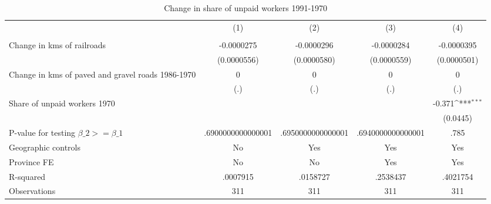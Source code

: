 \begin{table}[htbp]\centering
\def\sym#1{\ifmmode^{#1}\else\(^{#1}\)\fi}
\caption{Change in share of unpaid workers 1991-1970}
\begin{tabular}{l*{4}{c}}
\hline\hline
                &\multicolumn{1}{c}{(1)}&\multicolumn{1}{c}{(2)}&\multicolumn{1}{c}{(3)}&\multicolumn{1}{c}{(4)}\\
                &\multicolumn{1}{c}{}&\multicolumn{1}{c}{}&\multicolumn{1}{c}{}&\multicolumn{1}{c}{}\\
\hline
Change in kms of railroads&-0.0000275         &-0.0000296         &-0.0000284         &-0.0000395         \\
                &(0.0000556)         &(0.0000580)         &(0.0000559)         &(0.0000501)         \\
[1em]
Change in kms of paved and gravel roads 1986-1970&        0         &        0         &        0         &        0         \\
                &      (.)         &      (.)         &      (.)         &      (.)         \\
[1em]
Share of unpaid workers 1970&                  &                  &                  &   -0.371\sym{***}\\
                &                  &                  &                  & (0.0445)         \\
\hline
P-value for testing $\beta\_{2} >= \beta\_{1}$&.6900000000000001         &.6950000000000001         &.6940000000000001         &     .785         \\
Geographic controls&       No         &      Yes         &      Yes         &      Yes         \\
Province FE     &       No         &       No         &      Yes         &      Yes         \\
R-squared       & .0007915         & .0158727         & .2538437         & .4021754         \\
Observations    &      311         &      311         &      311         &      311         \\
\hline\hline
\end{tabular}
\end{table}
